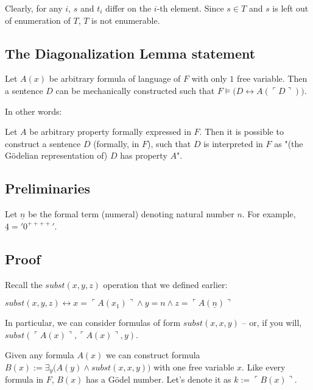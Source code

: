 \documentclass{article}
\begin{document}
Clearly, for any $i$, $s$ and $t_i$ differ on the $i$-th element.
Since $s \in T$ and $s$ is left out of enumeration of $T$, $T$ is not enumerable.

\subsection{The Diagonalization Lemma statement}

\begin{center}
    Let $A(x)$ be arbitrary formula of language of $F$ with only $1$ free variable. Then a sentence $D$ can be
    mechanically constructed such that $F \models \bigl( D \leftrightarrow A(\ulcorner D \urcorner) \bigl)$.
\end{center}

In other words:

\begin{center}
    Let $A$ be arbitrary property formally expressed in $F$. Then it is possible to construct a sentence $D$
    (formally, in $F$), such that $D$ is interpreted in $F$ as "(the Gödelian representation of) $D$ has property $A$".
\end{center}

\subsection{Preliminaries}

Let $\underline{n}$ be the formal term (numeral) denoting natural number $n$. For example,
$\underline{4} = '0^{++++}'$.

\subsection{Proof}

Recall the $subst(x, y, z)$ operation that we defined earlier:

\begin{center}
    $subst(x, y, z) \leftrightarrow x = \ulcorner A(x_1) \urcorner \land y = n \land z = \ulcorner A(\underline{n}) \urcorner$
\end{center}

In particular, we can consider formulas of form $subst(x, x, y)$ -- or, if you 
will, $subst(\ulcorner A(x) \urcorner, \ulcorner A(x) \urcorner, y)$.

Given any formula $A(x)$ we can construct formula
$B(x) := \exists_{y} \bigl( A(y) \land subst(x, x, y) \bigr)$
with one free variable $x$. Like every formula in $F$, $B(x)$ has a Gödel number.
Let's denote it as $k := \ulcorner B(x) \urcorner$.
\end{document}
